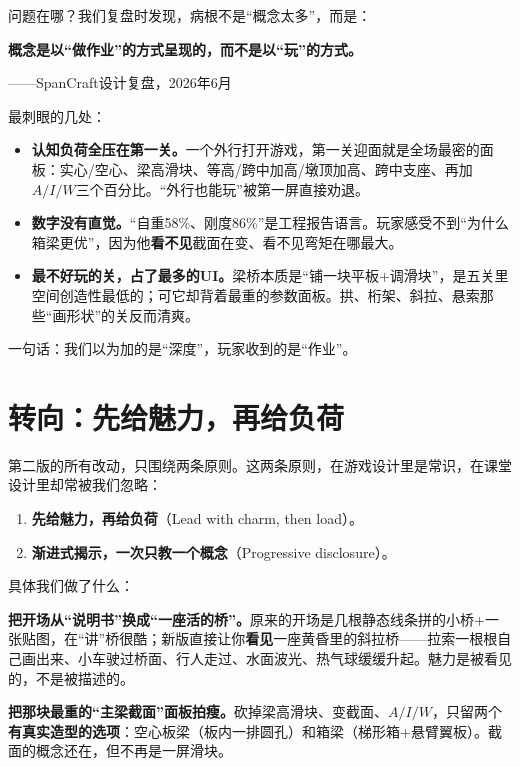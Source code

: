 问题在哪？我们复盘时发现，病根不是``概念太多''，而是：

\begin{shiyu-inline}
\textbf{概念是以``做作业''的方式呈现的，而不是以``玩''的方式。}

\hfill ——SpanCraft设计复盘，2026年6月
\end{shiyu-inline}

最刺眼的几处：

\begin{itemize}
  \item \textbf{认知负荷全压在第一关。}一个外行打开游戏，第一关迎面就是全场最密的面板：实心/空心、梁高滑块、等高/跨中加高/墩顶加高、跨中支座、再加$A/I/W$三个百分比。``外行也能玩''被第一屏直接劝退。
  \item \textbf{数字没有直觉。}``自重58\%、刚度86\%''是工程报告语言。玩家感受不到``为什么箱梁更优''，因为他\textbf{看不见}截面在变、看不见弯矩在哪最大。
  \item \textbf{最不好玩的关，占了最多的UI。}梁桥本质是``铺一块平板+调滑块''，是五关里空间创造性最低的；可它却背着最重的参数面板。拱、桁架、斜拉、悬索那些``画形状''的关反而清爽。
\end{itemize}

一句话：我们以为加的是``深度''，玩家收到的是``作业''。

\section{转向：先给魅力，再给负荷}

第二版的所有改动，只围绕两条原则。这两条原则，在游戏设计里是常识，在课堂设计里却常被我们忽略：

\begin{enumerate}
  \item \textbf{先给魅力，再给负荷}（Lead with charm, then load）。
  \item \textbf{渐进式揭示，一次只教一个概念}（Progressive disclosure）。
\end{enumerate}

具体我们做了什么：

\textbf{把开场从``说明书''换成``一座活的桥''。}原来的开场是几根静态线条拼的小桥+一张贴图，在``讲''桥很酷；新版直接让你\textbf{看见}一座黄昏里的斜拉桥——拉索一根根自己画出来、小车驶过桥面、行人走过、水面波光、热气球缓缓升起。魅力是被看见的，不是被描述的。

\textbf{把那块最重的``主梁截面''面板拍瘦。}砍掉梁高滑块、变截面、$A/I/W$，只留两个\textbf{有真实造型的选项}：空心板梁（板内一排圆孔）和箱梁（梯形箱+悬臂翼板）。截面的概念还在，但不再是一屏滑块。

